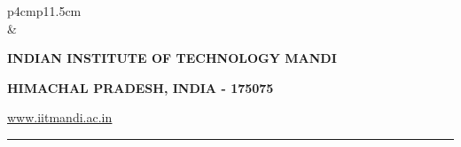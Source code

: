\documentclass[12 pt, a4paper]{article}
\newcommand{\HRule}{\rule{\linewidth}{1mm}}
\begin{document}
\clearpage



\pagestyle{empty}
\vskip 0.2cm
	\begin{tabular}{p{4cm}p{11.5cm}}
		  \\
		& \centering \large\bf\phantom{Empty line}\\ 
		\rule{0pt}{1pt} \centering \large\bf{INDIAN INSTITUTE OF TECHNOLOGY MANDI} \\
		\rule{0pt}{1pt} \centering \large\bf{HIMACHAL PRADESH, INDIA - 175075} \\
		\rule{0pt}{1pt} \centering \underline{\href{www.iitmandi.ac.in}{www.iitmandi.ac.in}}\\
	\end{tabular}
\noindent

{\raggedleft{}\HRule}




     
\clearpage




\end{document}
